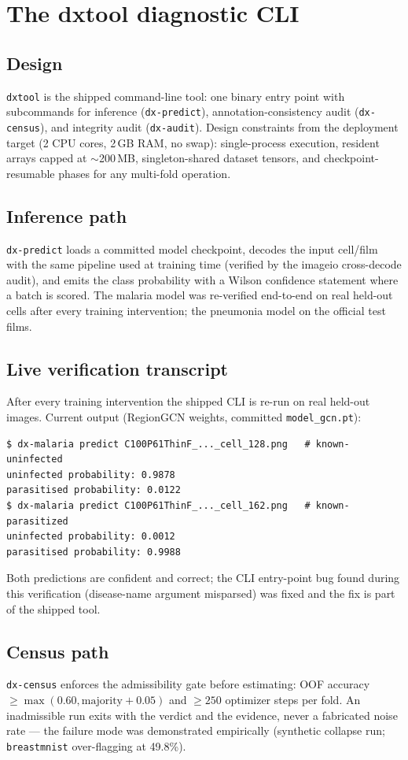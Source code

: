 
\section{The dxtool diagnostic CLI}
\subsection{Design}
\texttt{dxtool} is the shipped command-line tool: one binary entry point
with subcommands for inference (\texttt{dx-predict}), annotation-consistency audit
(\texttt{dx-census}), and integrity audit (\texttt{dx-audit}). Design
constraints from the deployment target (2 CPU cores, 2\,GB RAM, no swap):
single-process execution, resident arrays capped at $\sim$200\,MB,
singleton-shared dataset tensors, and checkpoint-resumable phases for any
multi-fold operation.
\subsection{Inference path}
\texttt{dx-predict} loads a committed model checkpoint, decodes the input
cell/film with the same pipeline used at training time (verified by the
imageio cross-decode audit), and emits the class probability with a Wilson
confidence statement where a batch is scored. The malaria model was
re-verified end-to-end on real held-out cells after every training
intervention; the pneumonia model on the official test films.
\subsection{Live verification transcript}
After every training intervention the shipped CLI is re-run on real
held-out images. Current output (RegionGCN weights, committed
\texttt{model\_gcn.pt}):
\begin{verbatim}
$ dx-malaria predict C100P61ThinF_..._cell_128.png   # known-uninfected
uninfected probability: 0.9878
parasitised probability: 0.0122
$ dx-malaria predict C100P61ThinF_..._cell_162.png   # known-parasitized
uninfected probability: 0.0012
parasitised probability: 0.9988
\end{verbatim}
Both predictions are confident and correct; the CLI entry-point bug found
during this verification (disease-name argument misparsed) was fixed and
the fix is part of the shipped tool.
\subsection{Census path}
\texttt{dx-census} enforces the admissibility gate before estimating: OOF
accuracy $\ge \max(0.60, \text{majority}+0.05)$ and $\ge 250$ optimizer
steps per fold. An inadmissible run exits with the verdict and the
evidence, never a fabricated noise rate --- the failure mode was
demonstrated empirically (synthetic collapse run; \texttt{breastmnist}
over-flagging at 49.8\%).
